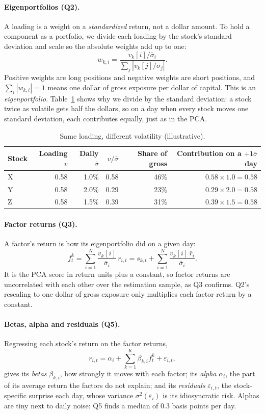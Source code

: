 \documentclass[12pt,letterpaper]{article}
\begin{document}
\paragraph{Eigenportfolios (Q2).} A loading is a weight on a
\emph{standardized} return, not a dollar amount. To hold a component as a
portfolio, we divide each loading by the stock's standard deviation and
scale so the absolute weights add up to one:
\[
w_{k,i}=\frac{v_k[i]/\bar\sigma_i}{\sum_{j}\left|v_k[j]/\bar\sigma_j\right|}.
\]
Positive weights are long positions and negative weights are short
positions, and $\sum_i|w_{k,i}|=1$ means one dollar of gross exposure per
dollar of capital. This is an \emph{eigenportfolio}.
Table~\ref{tab:primer-vol} shows why we divide by the standard deviation:
a stock twice as volatile gets half the dollars, so on a day when every
stock moves one standard deviation, each contributes equally, just as in
the PCA.

\begin{table}[H]
\centering
\caption{Same loading, different volatility (illustrative).}
\label{tab:primer-vol}
\begin{tabular}{lrrrrr}
\toprule
Stock & Loading $v$ & Daily $\bar\sigma$ & $v/\bar\sigma$ & Share of gross & Contribution on a $+1\bar\sigma$ day \\
\midrule
X & 0.58 & 1.0\% & 0.58 & 46\% & $0.58\times1.0=0.58$ \\
Y & 0.58 & 2.0\% & 0.29 & 23\% & $0.29\times2.0=0.58$ \\
Z & 0.58 & 1.5\% & 0.39 & 31\% & $0.39\times1.5=0.58$ \\
\bottomrule
\end{tabular}
\end{table}

\paragraph{Factor returns (Q3).} A factor's return is how its
eigenportfolio did on a given day:
\[
f^k_t=\sum_{i=1}^{N}\frac{v_k[i]}{\bar\sigma_i}\,r_{i,t}
=s_{k,t}+\sum_{i=1}^{N}\frac{v_k[i]\,\bar r_i}{\bar\sigma_i}.
\]
It is the PCA score in return units plus a constant, so factor returns
are uncorrelated with each other over the estimation sample, as Q3
confirms. Q2's rescaling to one dollar of gross exposure only multiplies
each factor return by a constant.

\paragraph{Betas, alpha and residuals (Q5).} Regressing each stock's
return on the factor returns,
\[
r_{i,t}=\alpha_i+\sum_{k=1}^{K}\beta_{k,i}f^k_t+\varepsilon_{i,t},
\]
gives its \emph{betas} $\beta_{k,i}$, how strongly it moves with each
factor; its \emph{alpha} $\alpha_i$, the part of its average return the
factors do not explain; and its \emph{residuals} $\varepsilon_{i,t}$, the
stock-specific surprise each day, whose variance $\sigma^2(\varepsilon_i)$
is its idiosyncratic risk. Alphas are tiny next to daily noise: Q5 finds a
median of 0.3 basis points per day.
\end{document}
